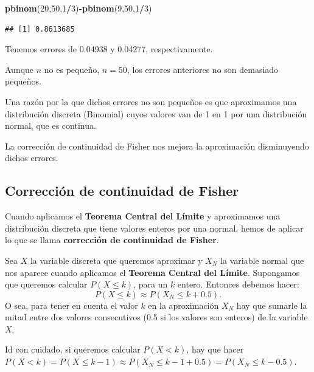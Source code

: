 \documentclass[]{book}
\newenvironment{Shaded}{\begin{snugshade}}{\end{snugshade}}
\newcommand{\DecValTok}[1]{\textcolor[rgb]{0.00,0.00,0.81}{#1}}
\newcommand{\KeywordTok}[1]{\textcolor[rgb]{0.13,0.29,0.53}{\textbf{#1}}}
\newcommand{\NormalTok}[1]{#1}
\newcommand{\OperatorTok}[1]{\textcolor[rgb]{0.81,0.36,0.00}{\textbf{#1}}}
\begin{document}
\begin{Shaded}
\begin{Highlighting}[]
\KeywordTok{pbinom}\NormalTok{(}\DecValTok{20}\NormalTok{,}\DecValTok{50}\NormalTok{,}\DecValTok{1}\OperatorTok{/}\DecValTok{3}\NormalTok{)}\OperatorTok{-}\KeywordTok{pbinom}\NormalTok{(}\DecValTok{9}\NormalTok{,}\DecValTok{50}\NormalTok{,}\DecValTok{1}\OperatorTok{/}\DecValTok{3}\NormalTok{)}
\end{Highlighting}
\end{Shaded}

\begin{verbatim}
## [1] 0.8613685
\end{verbatim}

Tenemos errores de 0.04938 y 0.04277, respectivamente.

Aunque \(n\) no es pequeño, \(n=50\), los errores anteriores no son demasiado pequeños.

Una razón por la que dichos errores no son pequeños es que aproximamos una distribución discreta (Binomial) cuyos valores van de 1 en 1 por una distribución normal, que es continua.

La corrección de continuidad de Fisher nos mejora la aproximación disminuyendo dichos errores.

\hypertarget{correcciuxf3n-de-continuidad-de-fisher}{%
\subsection{Corrección de continuidad de Fisher}\label{correcciuxf3n-de-continuidad-de-fisher}}

Cuando aplicamos el \textbf{Teorema Central del Límite} y aproximamos una distribución discreta que tiene valores enteros por una normal, hemos de aplicar lo que se llama \textbf{corrección de continuidad de Fisher}.

Sea \(X\) la variable discreta que queremos aproximar y \(X_N\) la variable normal que nos aparece cuando aplicamos el \textbf{Teorema Central del Límite}. Supongamos que queremos calcular \(P(X\leq k)\), para un \(k\) entero. Entonces debemos hacer:
\[
P(X\leq k)\approx P(X_N\leq k+0.5).
\]
O sea, para tener en cuenta el valor \(k\) en la aproximación \(X_N\) hay que sumarle la mitad entre dos valores consecutivos (0.5 si los valores son enteros) de la variable \(X\).

Id con cuidado, si queremos calcular \(P(X<k)\), hay que hacer \(P(X<k) =P(X\leq k-1)\approx P(X_N \leq k-1+0.5)=P(X_N\leq k-0.5)\).
\end{document}
